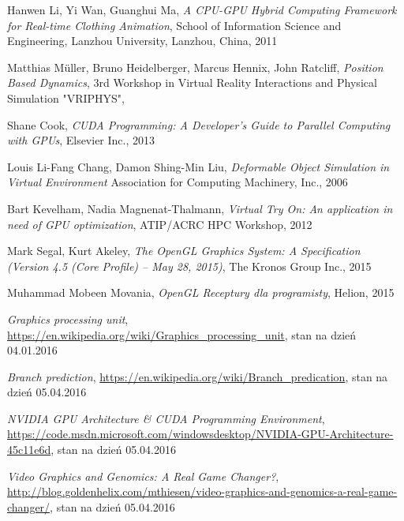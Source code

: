 \begin{thebibliography}{999}

 Hanwen Li, Yi Wan, Guanghui Ma, \emph{A CPU-GPU Hybrid Computing Framework for Real-time Clothing Animation}, School of Information Science and Engineering, Lanzhou University, Lanzhou, China, 2011

 Matthias Müller, Bruno Heidelberger, Marcus Hennix, John Ratcliff, \emph{Position Based Dynamics}, 3rd Workshop in Virtual Reality Interactions and Physical Simulation "VRIPHYS", 

 Shane Cook, \emph{CUDA Programming: A Developer's Guide to Parallel Computing with GPUs}, Elsevier Inc., 2013

 Louis Li-Fang Chang, Damon Shing-Min Liu, \emph{Deformable Object Simulation in Virtual Environment} Association for Computing Machinery, Inc., 2006

 Bart Kevelham, Nadia Magnenat-Thalmann, \emph{Virtual Try On: An application in need of GPU optimization}, ATIP/A\*CRC HPC Workshop, 2012

 Mark Segal, Kurt Akeley, \emph{The OpenGL Graphics System: A Specification (Version 4.5 (Core Profile) -- May 28, 2015)}, The Kronos Group Inc., 2015

 Muhammad Mobeen Movania, \emph{OpenGL Receptury dla programisty}, Helion, 2015

 \emph{Graphics processing unit}, \href{https://en.wikipedia.org/wiki/Graphics\_processing\_unit}{https://en.wikipedia.org/wiki/Graphics\_processing\_unit}, stan na dzień 04.01.2016

 \emph{Branch prediction}, \href{https://en.wikipedia.org/wiki/Branch\_predication}{https://en.wikipedia.org/wiki/Branch\_predication}, stan na dzień 05.04.2016

 \emph{NVIDIA GPU Architecture \& CUDA Programming Environment}, \linebreak \href{https://code.msdn.microsoft.com/windowsdesktop/NVIDIA-GPU-Architecture-45c11e6d}{https://code.msdn.microsoft.com/windowsdesktop/NVIDIA-GPU-Architecture-45c11e6d}, stan na dzień 05.04.2016

 \emph{Video Graphics and Genomics: A Real Game Changer?}, \linebreak \href{http://blog.goldenhelix.com/mthiesen/video-graphics-and-genomics-a-real-game-changer/}{http://blog.goldenhelix.com/mthiesen/video-graphics-and-genomics-a-real-game-changer/}, stan na dzień 05.04.2016


\end{thebibliography}
